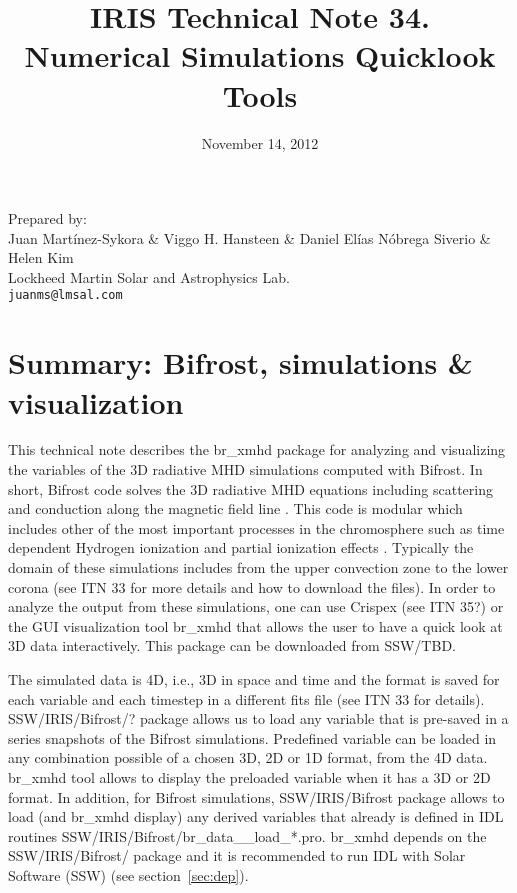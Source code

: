 \documentclass[12pt,preprint]{aastex}
\begin{document}
\title{\huge IRIS Technical Note 34. \\ \vspace{0.4cm}
Numerical Simulations Quicklook Tools}
\date{\hspace{5cm} \large November 14, 2012}

\noindent Prepared by: \\
Juan Mart\'inez-Sykora  \& Viggo H. Hansteen \& Daniel El\'ias N\'obrega Siverio \& Helen Kim \\
Lockheed Martin Solar and Astrophysics Lab. \\
\texttt{juanms@lmsal.com}

\tableofcontents

\section{Summary: Bifrost, simulations \& visualization }

This technical note describes the br\_xmhd package for analyzing and visualizing the 
variables of the 3D radiative MHD simulations computed with Bifrost. In short,
Bifrost code solves the 3D radiative MHD equations including scattering and conduction 
along the magnetic field line \citep{Gudiksen:2011qy}. This code is modular which includes 
other of the most important processes in the chromosphere such as time dependent Hydrogen 
ionization \citet{Leenaarts:2007sf} and partial ionization effects \cite{Martinez-Sykora:2012fk}. 
Typically the domain of these simulations includes from the upper convection zone to the 
lower corona (see ITN 33 for more details and how to download the files). In order to 
analyze the output from these simulations, one can use Crispex (see ITN 35?) or the 
GUI visualization tool br\_xmhd that allows the user to have a quick look at 
3D data interactively. This package can be downloaded from SSW/TBD. 


The simulated data is 4D, i.e., 3D in space and time and the format is saved for each 
variable and each timestep in a different fits file (see ITN 33 for details). SSW/IRIS/Bifrost/?
package allows us to load any variable 
that is pre-saved in a series snapshots of the Bifrost simulations. Predefined variable can
be loaded in any combination possible of a chosen 3D, 2D or 1D format, from the 4D data. 
br\_xmhd tool allows to display the preloaded variable when it has a 3D or 2D 
format. In addition, for Bifrost simulations, SSW/IRIS/Bifrost package allows to 
load (and br\_xmhd display) any derived variables that already is defined in IDL routines 
SSW/IRIS/Bifrost/br\_data\_\_load\_*.pro. br\_xmhd depends on the SSW/IRIS/Bifrost/ package 
and it is recommended to run IDL with Solar Software (SSW) (see section~\ref{sec:dep}).
\end{document}
